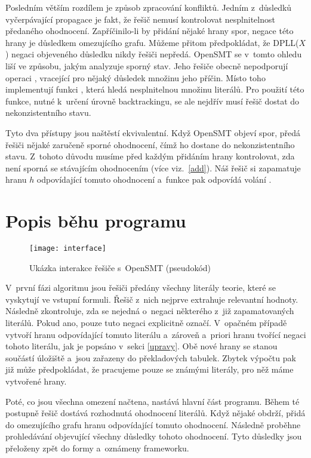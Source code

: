 Posledním větším rozdílem je způsob zpracování konfliktů. Jedním z~důsledků vyčerpávající propagace je fakt, že řešič nemusí kontrolovat nesplnitelnost předaného ohodnocení. Zapříčinilo-li by přidání nějaké hrany spor, negace této hrany je důsledkem omezujícího grafu. Můžeme přitom předpokládat, že DPLL($X$) negaci objeveného důsledku nikdy řešiči nepředá. OpenSMT se v~tomto ohledu liší ve způsobu, jakým analyzuje sporný stav. Jeho řešiče obecně nepodporují operaci , vracející pro nějaký důsledek množinu jeho příčin. Místo toho implementují funkci , která hledá nesplnitelnou množinu literálů. Pro použití této funkce, nutné k~určení úrovně backtrackingu, se ale nejdřív musí řešič dostat do nekonzistentního stavu.

Tyto dva přístupy jsou naštěstí ekvivalentní. Když OpenSMT objeví spor, předá řešiči nějaké zaručeně sporné ohodnocení, čímž ho dostane do nekonzistentního stavu. Z~tohoto důvodu musíme před každým přidáním hrany kontrolovat, zda není sporná se stávajícím ohodnocením (více viz.~\ref{add}). Náš řešič si zapamatuje hranu $h$ odpovídající tomuto ohodnocení a~funkce  pak odpovídá volání . 

\section{Popis běhu programu}

\begin{figure}
	\centering
	\texttt{[image: interface]}
	\caption{Ukázka interakce řešiče s~OpenSMT (pseudokód)}
\end{figure}

V~první fázi algoritmu jsou řešiči předány všechny literály teorie, které se vyskytují ve vstupní formuli. Řešič z~nich nejprve extrahuje relevantní hodnoty. Následně zkontroluje, zda se nejedná o~negaci některého z~již zapamatovaných literálů. Pokud ano, pouze tuto negaci explicitně označí. V~opačném případě vytvoří hranu odpovídající tomuto literálu a~zároveň a~priori hranu tvořící negaci tohoto literálu, jak je popsáno v~sekci \ref{upravy}. Obě nové hrany se stanou součástí úložiště a~jsou zařazeny do překladových tabulek. Zbytek výpočtu pak již může předpokládat, že pracujeme pouze se známými literály, pro něž máme vytvořené hrany.

Poté, co jsou všechna omezení načtena, nastává hlavní část programu. Během té postupně řešič dostává rozhodnutá ohodnocení literálů. Když nějaké obdrží, přidá do omezujícího grafu hranu odpovídající tomuto ohodnocení. Následně proběhne prohledávání objevující všechny důsledky tohoto ohodnocení. Tyto důsledky jsou přeloženy zpět do formy  a~oznámeny frameworku.

